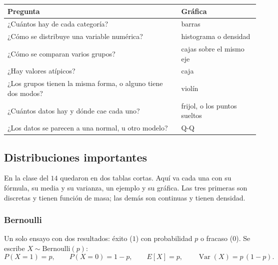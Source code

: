 \documentclass[11pt,letterpaper]{article}
\begin{document}
\begin{center}
\small
\begin{tabular}{>{\raggedright\arraybackslash}p{8.6cm}%
                >{\raggedright\arraybackslash}p{5.4cm}}
    \toprule
    \textbf{Pregunta} & \textbf{Gráfica} \\
    \midrule
    ¿Cuántos hay de cada categoría? & barras \\
    ¿Cómo se distribuye una variable numérica? & histograma o
        densidad \\
    ¿Cómo se comparan varios grupos? & cajas sobre el mismo eje \\
    ¿Hay valores atípicos? & caja \\
    ¿Los grupos tienen la misma forma, o alguno tiene dos modos? &
        violín \\
    ¿Cuántos datos hay y dónde cae cada uno? & frijol, o los puntos
        sueltos \\
    ¿Los datos se parecen a una normal, u otro modelo? & Q-Q \\
    \bottomrule
\end{tabular}
\end{center}


\subsection*{Distribuciones importantes}

En la clase del $14$ quedaron en dos tablas cortas. Aquí va cada una
con su fórmula, su media y su varianza, un ejemplo y su gráfica. Las
tres primeras son discretas y tienen función de masa; las demás son
continuas y tienen densidad.

\subsubsection*{Bernoulli}

Un solo ensayo con dos resultados: éxito ($1$) con probabilidad $p$ o
fracaso ($0$). Se escribe $X \sim \text{Bernoulli}(p)$:
\[
    P(X = 1) = p , \qquad P(X = 0) = 1 - p , \qquad
    E[X] = p , \qquad \operatorname{Var}(X) = p\,(1 - p) .
\]
\end{document}
